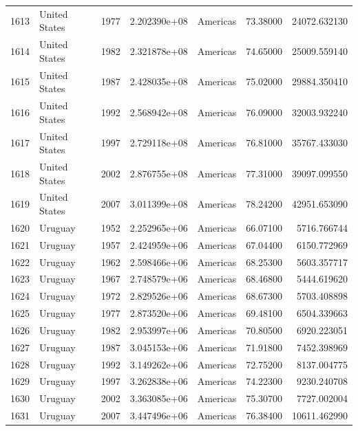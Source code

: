 \documentclass[
  letterpaper,
  DIV=11,
  numbers=noendperiod]{scrreprt}
\begin{document}
\begin{tabular}{llrrlrr}
1613 &             United States &  1977 &  2.202390e+08 &  Americas &  73.38000 &   24072.632130 \\
1614 &             United States &  1982 &  2.321878e+08 &  Americas &  74.65000 &   25009.559140 \\
1615 &             United States &  1987 &  2.428035e+08 &  Americas &  75.02000 &   29884.350410 \\
1616 &             United States &  1992 &  2.568942e+08 &  Americas &  76.09000 &   32003.932240 \\
1617 &             United States &  1997 &  2.729118e+08 &  Americas &  76.81000 &   35767.433030 \\
1618 &             United States &  2002 &  2.876755e+08 &  Americas &  77.31000 &   39097.099550 \\
1619 &             United States &  2007 &  3.011399e+08 &  Americas &  78.24200 &   42951.653090 \\
1620 &                   Uruguay &  1952 &  2.252965e+06 &  Americas &  66.07100 &    5716.766744 \\
1621 &                   Uruguay &  1957 &  2.424959e+06 &  Americas &  67.04400 &    6150.772969 \\
1622 &                   Uruguay &  1962 &  2.598466e+06 &  Americas &  68.25300 &    5603.357717 \\
1623 &                   Uruguay &  1967 &  2.748579e+06 &  Americas &  68.46800 &    5444.619620 \\
1624 &                   Uruguay &  1972 &  2.829526e+06 &  Americas &  68.67300 &    5703.408898 \\
1625 &                   Uruguay &  1977 &  2.873520e+06 &  Americas &  69.48100 &    6504.339663 \\
1626 &                   Uruguay &  1982 &  2.953997e+06 &  Americas &  70.80500 &    6920.223051 \\
1627 &                   Uruguay &  1987 &  3.045153e+06 &  Americas &  71.91800 &    7452.398969 \\
1628 &                   Uruguay &  1992 &  3.149262e+06 &  Americas &  72.75200 &    8137.004775 \\
1629 &                   Uruguay &  1997 &  3.262838e+06 &  Americas &  74.22300 &    9230.240708 \\
1630 &                   Uruguay &  2002 &  3.363085e+06 &  Americas &  75.30700 &    7727.002004 \\
1631 &                   Uruguay &  2007 &  3.447496e+06 &  Americas &  76.38400 &   10611.462990 \\

\end{tabular}
\end{document}

